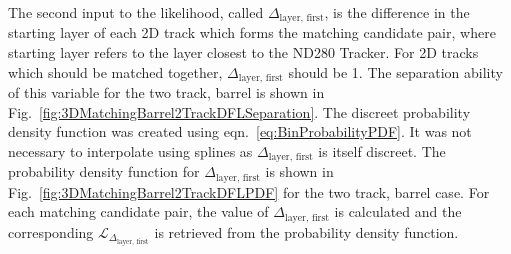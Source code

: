\newline
\newline
The second input to the likelihood, called $\Delta_{\textrm{layer, first}}$, is the difference in the starting layer of each 2D track which forms the matching candidate pair, where starting layer refers to the layer closest to the ND280 Tracker.  For 2D tracks which should be matched together, $\Delta_{\textrm{layer, first}}$ should be 1.  The separation ability of this variable for the two track, barrel is shown in Fig.~\ref{fig:3DMatchingBarrel2TrackDFLSeparation}.  The discreet probability density function was created using eqn.~\ref{eq:BinProbabilityPDF}.  It was not necessary to interpolate using splines as $\Delta_{\textrm{layer, first}}$ is itself discreet.  The probability density function for $\Delta_{\textrm{layer, first}}$ is shown in Fig.~\ref{fig:3DMatchingBarrel2TrackDFLPDF} for the two track, barrel case.  For each matching candidate pair, the value of $\Delta_{\textrm{layer, first}}$ is calculated and the corresponding $\mathcal{L}_{\Delta_{\textrm{layer, first}}}$ is retrieved from the probability density function.
